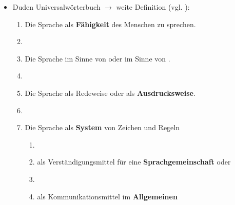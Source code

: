 \begin{frame}

\begin{itemize}
	\item<1-> Duden Universalwörterbuch $\rightarrow$ weite Definition (vgl. \citet{Duden13a}):
	
	\begin{enumerate}
		\item<2->\label{DefSprache1} Die Sprache als \textbf{Fähigkeit} des Menschen zu sprechen.
		\item[]
		\item<3->\label{DefSprache2} Die Sprache im Sinne von  oder im Sinne von .
		\item[]
		\item<4->\label{DefSprache3} Die Sprache als Redeweise oder als \textbf{Ausdrucksweise}.
		\item[]
		\item<5->\label{DefSprache4} Die Sprache als \textbf{System} von Zeichen und Regeln

		\begin{enumerate}
			\item[]
			\item<5->\label{DefSprache4a} als Verständigungsmittel für eine \textbf{Sprachgemeinschaft} oder
			\item[]
			\item<5->\label{DefSprache4b} als Kommunikationsmittel im \textbf{Allgemeinen}
		\end{enumerate}
			
	\end{enumerate}
	
\end{itemize}

\end{frame}



